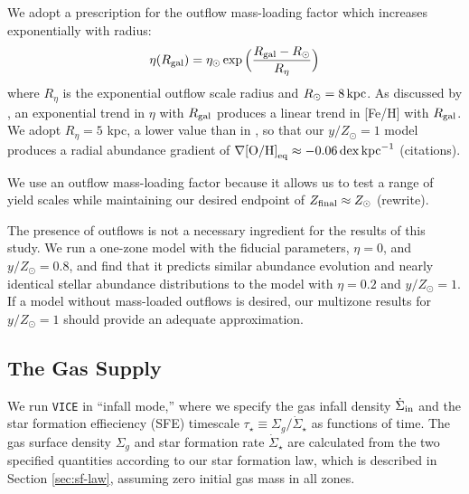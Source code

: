 \documentclass[twocolumn,twocolappendix,linenumbers]{aastex631}
\newcommand{\todo}[1]{{\color{red}#1}}
\newcommand{\mathOH}{{\rm [O/H]}}
\newcommand{\yZ}[1]{$y/Z_\odot=#1$}
\begin{document}
We adopt a prescription for the outflow mass-loading factor which increases exponentially with radius:
\begin{equation}
    \eta(R_{\rm gal}) = \eta_\odot \exp\Big(\frac{R_{\rm gal}-R_\odot}{R_\eta}\Big)
\end{equation}
where $R_\eta$ is the exponential outflow scale radius and $R_\odot=8\,{\rm kpc}$. As discussed by \citet{johnson_milky_2024}, an exponential trend in $\eta$ with $R_{\rm gal}$ produces a linear trend in [Fe/H] with $R_{\rm gal}$. We adopt $R_\eta=5$ kpc, a lower value than in \citet{johnson_milky_2024}, so that our $y/Z_\odot=1$ model produces a radial abundance gradient of $\nabla\mathOH_{\rm eq}\approx-0.06\,{\rm dex}\,{\rm kpc}^{-1}$ \todo{(citations)}.

We use an outflow mass-loading factor because it allows us to test a range of yield scales while maintaining our desired endpoint of $Z_{\rm final}\approx Z_\odot$ \todo{(rewrite)}.

The presence of outflows is not a necessary ingredient for the results of this study. We run a one-zone model with the fiducial parameters, $\eta=0$, and \yZ{0.8}, and find that it predicts similar abundance evolution and nearly identical stellar abundance distributions to the model with $\eta=0.2$ and \yZ{1}. If a model without mass-loaded outflows is desired, our multizone results for \yZ{1} should provide an adequate approximation.

\subsection{The Gas Supply}
\label{sec:sfh}

We run {\tt VICE} in ``infall mode,'' where we specify the gas infall density $\dot\Sigma_{\rm in}$ and the star formation effieciency (SFE) timescale $\tau_\star\equiv \Sigma_g / \dot\Sigma_\star$ as functions of time. The gas surface density $\Sigma_g$ and star formation rate $\dot\Sigma_\star$ are calculated from the two specified quantities according to our star formation law, which is described in Section \ref{sec:sf-law}, assuming zero initial gas mass in all zones.
\end{document}

